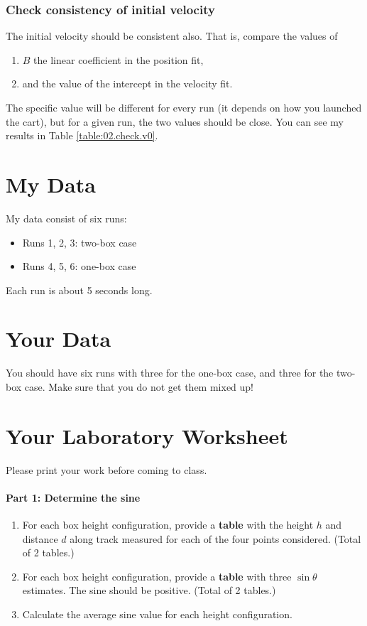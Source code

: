 \subsubsection{Check consistency of initial velocity}
%
The initial velocity should be consistent also. That is, compare the values of
\begin{enumerate}
    \item $B$ the linear coefficient in the position fit,
    \item and the value of the intercept in the velocity fit.
\end{enumerate}
The specific value will be different for every run (it depends on how you launched the cart), but for a given run, the two values should be close. You can see my results in Table \ref{table:02.check.v0}.
%
\section{My Data}
%
My data consist of six runs:
\begin{itemize}
    \item Runs 1, 2, 3: two-box case
    \item Runs 4, 5, 6: one-box case
\end{itemize}
Each run is about 5 seconds long.
%
\section{Your Data}
%
You should have six runs with three for the one-box case, and three for the two-box case. Make sure that you do not get them mixed up!
%
\newpage
\section{Your Laboratory Worksheet}
%
Please print your work before coming to class.
%
\paragraph{Part 1: Determine the sine}
%
\begin{enumerate}
    \item For each box height configuration, provide a \textbf{table} with the height $h$ and distance $d$ along track measured for each of the four points considered. (Total of 2 tables.)
    \item For each box height configuration, provide a \textbf{table} with three $\sin \theta$ estimates. The sine should be positive. (Total of 2 tables.)
    \item Calculate the average sine value for each height configuration.
\end{enumerate}
%
